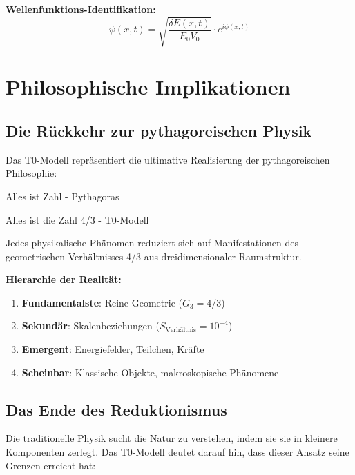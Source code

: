 \documentclass[12pt,a4paper]{report}
\begin{document}
	\textbf{Wellenfunktions-Identifikation:}
	\begin{equation}
		\psi(x,t) = \sqrt{\frac{\delta E(x,t)}{E_0 V_0}} \cdot e^{i\phi(x,t)}
	\end{equation}
	
	\section{Philosophische Implikationen}
	\label{sec:philosophical_implications}
	
	\subsection{Die Rückkehr zur pythagoreischen Physik}
	\label{subsec:pythagorean_physics}
	
	Das T0-Modell repräsentiert die ultimative Realisierung der pythagoreischen Philosophie:
	
	\begin{tcolorbox}[colback=blue!5!white,colframe=blue!75!black,title=Realisierte pythagoreische Einsicht]
		Alles ist Zahl - Pythagoras
		
		Alles ist die Zahl 4/3 - T0-Modell
		
		Jedes physikalische Phänomen reduziert sich auf Manifestationen des geometrischen Verhältnisses 4/3 aus dreidimensionaler Raumstruktur.
	\end{tcolorbox}
	
	\textbf{Hierarchie der Realität:}
	\begin{enumerate}
		\item \textbf{Fundamentalste}: Reine Geometrie ($G_3 = 4/3$)
		\item \textbf{Sekundär}: Skalenbeziehungen ($S_{\text{Verhältnis}} = 10^{-4}$)
		\item \textbf{Emergent}: Energiefelder, Teilchen, Kräfte
		\item \textbf{Scheinbar}: Klassische Objekte, makroskopische Phänomene
	\end{enumerate}
	
	\subsection{Das Ende des Reduktionismus}
	\label{subsec:end_reductionism}
	
	Die traditionelle Physik sucht die Natur zu verstehen, indem sie sie in kleinere Komponenten zerlegt. Das T0-Modell deutet darauf hin, dass dieser Ansatz seine Grenzen erreicht hat:
	
\end{document}
